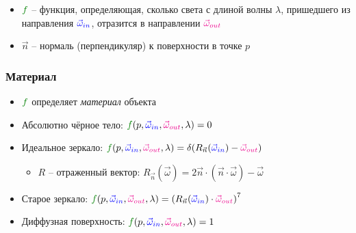 \documentclass[handout,10pt]{beamer}
\begin{document}
\begin{frame}[fragile]
\begin{itemize}
\pause
\item \begin{math}{\color{green}f}\end{math} -- функция, определяющая, сколько света с длиной волны \begin{math}\lambda\end{math}, пришедшего из направления \begin{math}{\color{blue}\vec\omega_{in}}\end{math}, отразится в направлении \begin{math}{\color{magenta}\vec\omega_{out}}\end{math}
\pause
\item \begin{math}\vec n\end{math} -- нормаль (перпендикуляр) к поверхности в точке \begin{math}p\end{math}
\end{itemize}
\end{frame}

\begin{frame}[fragile]
\frametitle{Материал}
\begin{itemize}
\item \begin{math}{\color{green}f}\end{math} определяет \textit{материал} объекта
\pause 
\item Абсолютно чёрное тело: \begin{math}{\color{green}f}(p, {\color{blue}\vec\omega_{in}}, {\color{magenta}\vec\omega_{out}}, \lambda) = 0\end{math}
\pause
\item Идеальное зеркало: \begin{math}{\color{green}f}(p, {\color{blue}\vec\omega_{in}}, {\color{magenta}\vec\omega_{out}}, \lambda) = \delta({R_{\vec n}(\color{blue}\vec\omega_{in}}) - {\color{magenta}\vec\omega_{out}})\end{math}
\begin{itemize}
\item \begin{math}R\end{math} -- отраженный вектор: \begin{math}R_{\vec n}(\vec \omega) = 2\vec n \cdot (\vec n \cdot \vec \omega) - \vec \omega\end{math}
\end{itemize}
\pause
\item Старое зеркало: \begin{math}{\color{green}f}(p, {\color{blue}\vec\omega_{in}}, {\color{magenta}\vec\omega_{out}}, \lambda) = \left(R_{\vec n}({\color{blue}\vec\omega_{in}})\cdot{\color{magenta}\vec\omega_{out}}\right)^7\end{math}
\pause
\item Диффузная поверхность: \begin{math}{\color{green}f}(p, {\color{blue}\vec\omega_{in}}, {\color{magenta}\vec\omega_{out}}, \lambda) = 1\end{math}
\end{itemize}
\end{frame}
\end{document}
